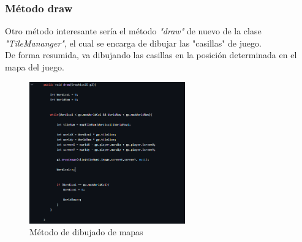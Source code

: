 \documentclass[a4paper]{article}
\begin{document}
\subsubsection{Método draw}
Otro método interesante sería el método \textit{"draw"} de nuevo de la clase \textit{"TileMananger"}, el cual se encarga de dibujar las "casillas" de juego.\\
De forma resumida, va dibujando las casillas en la posición determinada en el mapa del juego.\\
\begin{figure}[ht]
    \centering
    \includegraphics[width=0.6\textwidth]{Images/draw.PNG}
    \caption{Método de dibujado de mapas}
    \label{fig:metododibujadodemapa}
\end{figure}
\end{document}
